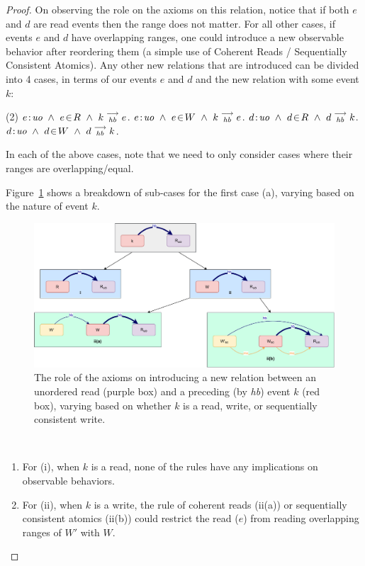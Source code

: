 \begin{proof}
        On observing the role on the axioms on this relation, notice that if both $e$ and $d$ are read events then the range does not matter. For all other cases, if events $e$ and $d$ have overlapping ranges, one could introduce a new observable behavior after reordering them (a simple use of Coherent Reads / Sequentially Consistent Atomics).        
        Any other new relations that are introduced can be divided into 4 cases, in terms of our events $e$ and $d$ and the new relation with some event $k$:
        \begin{tasks}(2)
            \task  $\et{e}{uo} \ \wedge \ \event{e}{R} \ \wedge \ \reln{k}{hb}{e}$.
            \task  $e\!:\!\textit{uo} \ \wedge \  e\!\in\!W \ \wedge \ k\stackrel{\longrightarrow}{_{\textit{hb}}}e$.
            \task  $\et{d}{uo} \ \wedge \  \event{d}{R} \ \wedge \ \reln{d}{hb}{k}$.
            \task  $d\!:\!\textit{uo} \ \wedge \ d\!\in\!W \ \wedge \ d\stackrel{\longrightarrow}{_{\textit{hb}}}k$.
        \end{tasks}
        In each of the above cases, note that we need to only consider cases where their ranges are overlapping/equal.
        
        Figure~\ref{fig:subcases} shows a breakdown of sub-cases for the first case (a), varying based
        on the nature of event $k$.
        \begin{figure}
            \centering
            \includegraphics[width=\textwidth]{Q3_(b)Case1.pdf}
            \caption{The role of the axioms on introducing a new relation between an unordered read (purple box) and a preceding (by \textit{hb}) event $k$ (red box), varying based on whether $k$ is a read, write, or sequentially consistent write.}
            \label{fig:subcases}
        \end{figure}
        \
        \begin{enumerate}
            \item For (i), when $k$ is a read, none of the rules have any implications on observable behaviors.
            \item For (ii), when $k$ is a write, the rule of coherent reads (ii(a)) or sequentially consistent atomics (ii(b)) could restrict the read ($e$) from reading overlapping ranges of $W'$ with $W$.
        \end{enumerate}
        

\end{proof}

